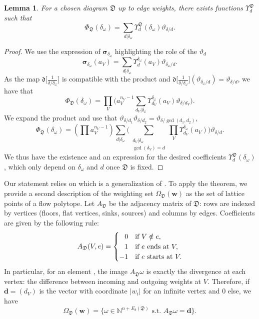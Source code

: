 \documentclass[pdftex]{sigma}
\newcommand{\NN}{\mathbb{N}}
\newcommand{\ZZ}{\mathbb{Z}}
\newcommand{\bfw}{ {\boldsymbol w} }
\newcommand{\Dfk}{\mathfrak{D}}
\newcommand{\dfk}{\mathfrak{d}}
\numberwithin{equation}{section}
\newtheorem{lem}[theo]{Lemma}
\theoremstyle{definition}
\begin{document}
\begin{lem}\label{lem-multiplicity-polynomiality-statement}
 For a chosen diagram $\Dfk$ up to edge weights, there exists functions $\Upsilon^\Dfk_d$ such that
 \[ \Phi_\Dfk(\delta_\omega) = \sum_{d|\delta_\omega} \Upsilon^\Dfk_d(\delta_\omega)\vartheta_{\delta/d}. \]
\end{lem}

\begin{proof}
 We use the expression of $\boldsymbol{\sigma}_{\delta_\omega}$ highlighting the role of the $\vartheta_d$
 \[ \boldsymbol{\sigma}_{\delta_\omega}(a_V) = \sum_{d|\delta_\omega}\Upsilon_d^{\delta_\omega}(a_V)\vartheta_{\delta_\omega/d}. \]
 As the map $\dfk\big[\frac{1}{\delta/\delta_\omega}\big]$ is compatible with the product and $\dfk\big[\frac{1}{\delta/\delta_\omega}\big](\vartheta_{\delta_\omega/d})=\vartheta_{\delta/d}$, we have that
 \[ \Phi_\Dfk(\delta_\omega) = \prod_V \biggl(a_V^{n_V-1}\sum_{d_V|\delta_\omega}\Upsilon_{d_V}^{\delta_\omega}(a_V)\vartheta_{\delta/d_V}\biggr). \]
 We expand the product and use that $\vartheta_{\delta/d_1}\vartheta_{\delta/d_2}=\vartheta_{\delta/\gcd(d_1,d_2)}$,
 \[ \Phi_\Dfk(\delta_\omega) = \left(\prod a_V^{n_V-1}\right)\sum_{d|\delta_\omega}\biggl(\sum_{\substack{d_V|\delta_\omega \\ \gcd(\delta_V)=d}}\prod_V\Upsilon_{d_V}^{\delta_\omega}(a_V)\biggr)\vartheta_{\delta/d}. \]
 We thus have the existence and an expression for the desired coefficients $\Upsilon^\Dfk_d(\delta_\omega)$, which only depend on $\delta_\omega$ and $d$ once $\Dfk$ is fixed.
\end{proof}

Our statement relies on \cite[Theorem 4.2]{ardila2017double} which is a generalization of \cite[Theorem 1]{sturmfels1995vector}. To apply the theorem, we provide a second description of the weighting set $\Omega_\Dfk(\bfw)$ as the set of lattice points of a flow polytope. Let $A_\Dfk$ be the adjacency matrix of $\Dfk$: rows are indexed by vertices (floors, flat vertices, sinks, sources) and columns by edges. Coefficients are given by the following rule:
\[ A_\Dfk(V,e) = \begin{cases}
 \hphantom{-}0 &\text{if }V\notin e,\\
 \hphantom{-}1 & \text{if }e\text{ ends at }V,\\
 -1 & \text{if }e\text{ starts at }V.
\end{cases} \]
In particular, for an element \smash{$\omega\in\ZZ^{n+|E_b(\Dfk)|}$}, the image $A_\Dfk\omega$ is exactly the divergence at each vertex: the difference between incoming and outgoing weights at $V$. Therefore, if $\mathbf{d}=(d_V)$ is the vector with coordinate $|w_i|$ for an infinite vertex and $0$ else, we have
\[ \Omega_\Dfk(\bfw) = \big\{ \omega\in\NN^{n+ E_b(\Dfk)} \text{ s.t. } A_\Dfk\omega=\mathbf{d} \big\}. \]
\end{document}
